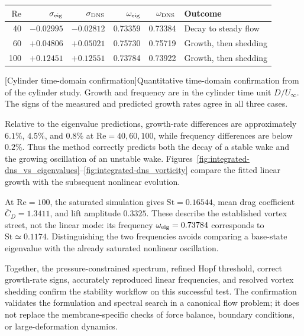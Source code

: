 \par\medskip\noindent\begin{minipage}{\linewidth}\centering\small
\begin{tabular}{rrrrrl}\toprule
$\mathrm{Re}$ & $\sigma_{\rm eig}$ & $\sigma_{\rm DNS}$ & $\omega_{\rm eig}$ & $\omega_{\rm DNS}$ & Outcome\\\midrule
40 & $-0.02995$ & $-0.02812$ & 0.73359 & 0.73384 & Decay to steady flow\\
60 & $+0.04806$ & $+0.05021$ & 0.75730 & 0.75719 & Growth, then shedding\\
100 & $+0.12451$ & $+0.12551$ & 0.73784 & 0.73922 & Growth, then shedding\\\bottomrule
\end{tabular}
[Cylinder time-domain confirmation]{Quantitative time-domain confirmation from  of the cylinder study. Growth and frequency are in the cylinder time unit $D/U_\infty$. The signs of the measured and predicted growth rates agree in all three cases.}
\label{tab:cylinder-dns}
\end{minipage}\par\medskip
Relative to the eigenvalue predictions, growth-rate differences are approximately $6.1\%$, $4.5\%$, and $0.8\%$ at $\mathrm{Re}=40,60,100$, while frequency differences are below $0.2\%$. Thus the method correctly predicts both the decay of a stable wake and the growing oscillation of an unstable wake. Figures~\ref{fig:integrated-dns_vs_eigenvalues}--\ref{fig:integrated-dns_vorticity} compare the fitted linear growth with the subsequent nonlinear evolution.

At $\mathrm{Re}=100$, the saturated simulation gives $\mathrm{St}=0.16544$, mean drag coefficient $\overline C_D=1.3411$, and lift amplitude $0.3325$. These describe the established vortex street, not the linear mode: its frequency $\omega_{\rm eig}=0.73784$ corresponds to $\mathrm{St}\simeq0.1174$. Distinguishing the two frequencies avoids comparing a base-state eigenvalue with the already saturated nonlinear oscillation.

Together, the pressure-constrained spectrum, refined Hopf threshold, correct growth-rate signs, accurately reproduced linear frequencies, and resolved vortex shedding confirm the stability workflow on this successful test. The confirmation validates the formulation and spectral search in a canonical flow problem; it does not replace the membrane-specific checks of force balance, boundary conditions, or large-deformation dynamics.


